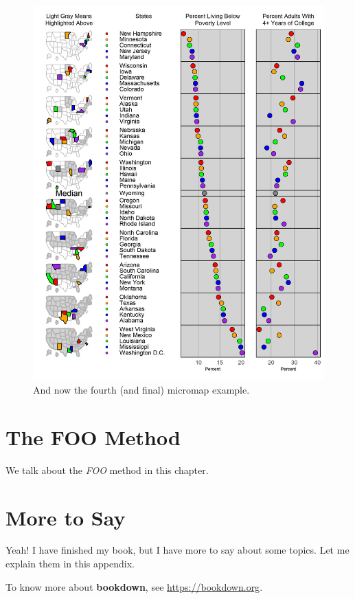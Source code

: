 \documentclass[
]{krantz}
\begin{document}
\begin{figure}
\includegraphics[width=0.9\linewidth]{JSmicromap4} \caption{And now the fourth (and final) micromap example.}\label{fig:micromap5}
\end{figure}

\hypertarget{the-foo-method}{%
\chapter{The FOO Method}\label{the-foo-method}}

We talk about the \emph{FOO} method in this chapter.

\cleardoublepage

\hypertarget{appendix-appendix}{%
\appendix {}}


\hypertarget{more-to-say}{%
\chapter{More to Say}\label{more-to-say}}

Yeah! I have finished my book, but I have more to say about some topics. Let me explain them in this appendix.

To know more about \textbf{bookdown}, see \url{https://bookdown.org}.

  

\backmatter
\printindex
\end{document}
